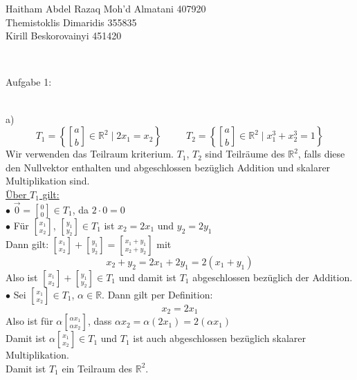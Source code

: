 \documentclass[11pt]{article}
\DeclareRobustCommand{\brkbinom}{\genfrac[]{0pt}{}}
\begin{document}
	\noindent \begin{huge}Haitham Abdel Razaq Moh'd Almatani  407920\\
	
	\noindent Themistoklis Dimaridis 355835\\
	
	
	\noindent Kirill Beskorovainyi 	451420\end{huge}\\\vspace{0.05in}
	
		\noindent \begin{Large}Aufgabe 1:\end{Large}\\[2pt]
			\indent a)\\
				$$T_1= \left\{\brkbinom{a}{b} \in \mathbb{R}^2 \mid 2x_1=x_2 \right\} \hspace{30pt} T_2= \left\{\brkbinom{a}{b} \in \mathbb{R}^2 \mid x_1^3+x_2^3=1 \right\}$$
				Wir verwenden das Teilraum kriterium. $T_1$, $T_2$ sind Teilräume des $\mathbb{R}^2$, falls diese den Nullvektor enthalten und abgeschlossen bezüglich Addition und skalarer Multiplikation sind.\\
				\underline{Über $T_1$ gilt:}\\
				\indent $\bullet$ $\vec{0}=\brkbinom{0}{0} \in T_1$, da $2 \cdot 0 = 0$\\
				\indent $\bullet$ Für $\brkbinom{x_1}{x_2}$, $\brkbinom{y_1}{y_2} \in T_1$ ist $x_2=2x_1$ und $y_2=2y_1$\\ 
				Dann gilt: $\brkbinom{x_1}{x_2}+\brkbinom{y_1}{y_2}=\brkbinom{x_1+y_1}{x_2+y_2}$ mit\\
				$$x_2+y_2=2x_1+2y_1=2(x_1+y_1)$$
				Also ist $\brkbinom{x_1}{x_2}+\brkbinom{y_1}{y_2} \in T_1$ und damit ist $T_1$ abgeschlossen bezüglich der Addition.\\
				\indent $\bullet$ Sei $\brkbinom{x_1}{x_2} \in T_1$, $\alpha \in \mathbb{R}$. Dann gilt per Definition:\\
				$$x_2=2x_1$$
				Also ist für $\alpha \brkbinom{\alpha x_1}{\alpha x_2}$, dass $\alpha x_2=\alpha (2x_1)=2(\alpha x_1)$\\
				Damit ist $\alpha \brkbinom{x_1}{x_2} \in T_1$ und $T_1$ ist auch abgeschlossen bezüglich skalarer Multiplikation.\\
				Damit ist $T_1$ ein Teilraum des $\mathbb{R}^2$.\\
				
\end{document}

